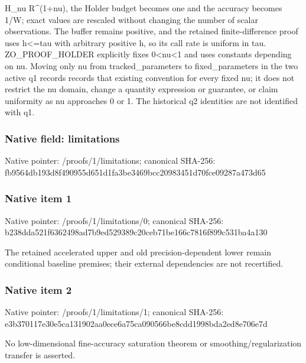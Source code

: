 \documentclass[10pt,a4paper]{article}
\begin{document}
H\_\allowbreak{}nu R\textasciicircum{}(1+nu),\allowbreak{} the Holder budget becomes one and the accuracy becomes 1/\allowbreak{}W;\allowbreak{} exact values are rescaled without changing the number of scalar observations. The buffer remains positive,\allowbreak{} and the retained finite-difference proof uses h<=\allowbreak{}tau with arbitrary positive h,\allowbreak{} so its call rate is uniform in tau. ZO\_\allowbreak{}PROOF\_\allowbreak{}HOLDER explicitly fixes 0<nu<1 and uses constants depending on nu. Moving only nu from tracked\_\allowbreak{}parameters to fixed\_\allowbreak{}parameters in the two active q1 records records that existing convention for every fixed nu;\allowbreak{} it does not restrict the nu domain,\allowbreak{} change a quantity expression or guarantee,\allowbreak{} or claim uniformity as nu approaches 0 or 1. The historical q2 identities are not identified with q1.\par\endgroup

\subsubsection{Native field: limitations}
Native pointer: /proofs/1/limitations; canonical SHA-256: fb9564db193d8f490955d651d1fa3be3469bcc20983451d70fce09287a473d65

\subsubsection{Native item 1}
Native pointer: /proofs/1/limitations/0; canonical SHA-256: b238dda521f6362498ad7b9ed529389c20ceb71be166c7816f899c531ba4a130

\begingroup\raggedright\sloppy The retained accelerated upper and old precision-dependent lower remain conditional baseline premises;\allowbreak{} their external dependencies are not recertified.\par\endgroup

\subsubsection{Native item 2}
Native pointer: /proofs/1/limitations/1; canonical SHA-256: e3b370117e30e5ca131902aa0ece6a75ca090566be8cdd1998bda2ed8e706e7d

\begingroup\raggedright\sloppy No low-dimensional fine-accuracy saturation theorem or smoothing/\allowbreak{}regularization transfer is asserted.\par\endgroup
\end{document}
